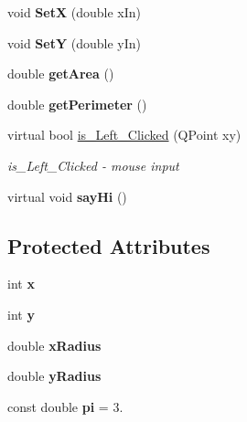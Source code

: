 \begin{DoxyCompactItemize}
\mbox{\label{class_ellipse_ad36cbee77639c82f50b763d2b9bbdcf0}} 
void {\bfseries SetX} (double x\+In)
\item 
\mbox{\label{class_ellipse_a79f8116ec899b31ef5f2281e44b90c1f}} 
void {\bfseries SetY} (double y\+In)
\item 
\mbox{\label{class_ellipse_a3b6a92ab290475f2c6eb5a930b31d741}} 
double {\bfseries get\+Area} ()
\item 
\mbox{\label{class_ellipse_a6b5ac7a4f1e68f9c5a66f0d8d66acc3c}} 
double {\bfseries get\+Perimeter} ()
\item 
virtual bool \hyperlink{class_ellipse_ab3ba6c9f068fc37808778c74f1273f69}{is\+\_\+\+Left\+\_\+\+Clicked} (Q\+Point xy)
\begin{DoxyCompactList}\small\item\em is\+\_\+\+Left\+\_\+\+Clicked -\/ mouse input \end{DoxyCompactList}\item 
\mbox{\label{class_ellipse_a8382720255d2a9625e3d785324d2f9f7}} 
virtual void {\bfseries say\+Hi} ()
\end{DoxyCompactItemize}
\subsection*{Protected Attributes}
\begin{DoxyCompactItemize}
\item 
\mbox{\label{class_ellipse_a70771f8c320a2ae285a04fa97e808ff0}} 
int {\bfseries x}
\item 
\mbox{\label{class_ellipse_a37ca7f50a9df28e00428077cc1a38a3a}} 
int {\bfseries y}
\item 
\mbox{\label{class_ellipse_a8e0e2fa0f3200a997f4b0567e588c823}} 
double {\bfseries x\+Radius}
\item 
\mbox{\label{class_ellipse_a83614d1aaa446b1f8e404b6bc3cc8c19}} 
double {\bfseries y\+Radius}
\item 
\mbox{\label{class_ellipse_af632e808976bdd5598bbae897cc359d7}} 
const double {\bfseries pi} = 3.
\end{DoxyCompactItemize}
